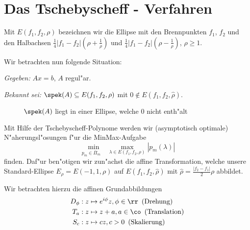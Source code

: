 \section{Das Tschebyscheff - Verfahren}

\begin{defn}
Mit $E(f_1,f_2,\rho)$ bezeichnen wir die Ellipse mit den Brennpunkten $f_1$, $f_2$ und den Halbachsen $
\frac{1}{4}\left|f_1-f_2\right|\left(\rho + \frac{1}{\rho}\right)$
und  $\frac{1}{4}\left|f_1-f_2\right|\left(\rho - \frac{1}{\rho}\right)$,
$\rho \ge 1$.
\end{defn}

Wir betrachten nun folgende Situation:

\medskip

\emph{Gegeben: } $Ax = b$, $A$ regul"ar.

\emph{Bekannt sei:} $\spek(A) \subseteq E(f_1,f_2,\rho)$ mit $0 \not \in E(f_1,f_2,\hat{\rho})$.

\begin{figure}[h!]
\begin{center}


\end{center}
\caption{$\spek(A)$ liegt in einer Ellipse, welche 0 nicht enth"alt}
\end{figure}

Mit Hilfe der Tschebyscheff-Polynome werden wir (asymptotisch optimale) N"aherungsl"osungen
f"ur die MinMax-Aufgabe
\begin{equation} \label{minmaxell2_eq}
\underset{p_m \in \overline{\Pi}_m \quad}{\min}\underset{\lambda \in E(f_1,f_2,\rho)}{\max}\left| p_m(\lambda)\right|
\end{equation}
finden. Daf"ur ben"otigen wir zun"achst die affine Transformation, welche
unsere Standard-Ellipse $E_{\rho} = E(-1,1,\rho)$ auf $E(f_1,f_2,\hat{\rho})$ mit $\hat{\rho} = \frac{|f_2 - f_1|}{2} \rho$  abbildet.

Wir betrachten hierzu die affinen Grundabbildungen
\begin{align*}
D_{ \phi}&: z \mapsto e^{i \phi}z, \phi \in \rr \enspace (\text{Drehung})\\
T_a&:z \mapsto z + a, a \in \co \enspace (\text{Translation})\\
S_c&: z \mapsto cz, c >0 \enspace (\text{Skalierung})
\end{align*}

